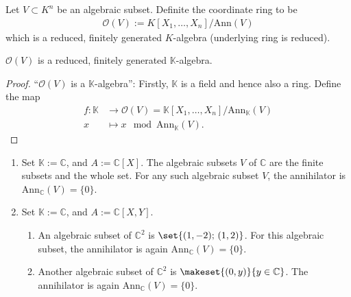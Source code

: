 \begin{defbox}
    \begin{definition}
        Let \(V \subset K^n\) be an algebraic subset. Definite the coordinate ring to be \begin{align*}
            \mathcal{O}(V) := K[X_1, \ldots, X_n] / \text{Ann}(V)
        \end{align*}
        which is a reduced, finitely generated \(K\)-algebra (underlying ring is reduced).
    \end{definition}
\end{defbox}
\begin{thmbox}
    \begin{proposition}
        \(\mathcal{O}(V)\) is a reduced, finitely generated \(\mathbb{K}\)-algebra.
    \end{proposition}
\end{thmbox}
\begin{proof}
    ``\(\mathcal{O}(V)\) is a \(\mathbb{K}\)-algebra'': Firstly, \(\mathbb{K}\) is a field and hence also a ring. Define the map
    \begin{align*}
        f: \mathbb{K} &\longrightarrow \mathcal{O}(V) = \mathbb{K}[X_1, \ldots, X_n] / \text{Ann}_\mathbb{K}(V) \\
        x &\longmapsto x \mod{\text{Ann}_\mathbb{K}(V)} \text{.}
    \end{align*}
\end{proof}
\begin{example}
    \begin{enumerate}
        \item Set \(\mathbb{K} := \mathbb{C}\), and \(A := \mathbb{C}[X]\). The algebraic subsets \(V\) of \(\mathbb{C}\) are the finite subsets and the whole set. For any such algebraic subset \(V\), the annihilator is \(\text{Ann}_\mathbb{C}(V) = \{0\}\).
        \item Set \(\mathbb{K} := \mathbb{C}\), and \(A := \mathbb{C}[X, Y]\).
        \begin{enumerate}
            \item An algebraic subset of \(\mathbb{C}^2\) is \(\set{(1, -2);\, (1, 2)}\). For this algebraic subset, the annihilator is again \(\text{Ann}_\mathbb{C}(V) = \{0\}\).
            \item Another algebraic subset of \(\mathbb{C}^2\) is \(\makeset{(0, y)}{y \in \mathbb{C}}\). The annihilator is again \(\text{Ann}_\mathbb{C}(V) = \{0\}\).
        \end{enumerate}
    \end{enumerate}
\end{example}
